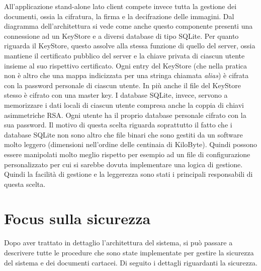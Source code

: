 All'applicazione stand-alone lato client compete invece tutta la gestione dei documenti, ossia la cifratura, la firma e la decifrazione delle immagini. Dal diagramma dell'architettura si vede come anche questo componente presenti una connessione ad un KeyStore e a diversi database di tipo SQLite. Per quanto riguarda il KeyStore, questo assolve alla stessa funzione di quello del server, ossia mantiene il certificato pubblico del server e la chiave privata di ciascun utente insieme al suo rispettivo certificato. Ogni entry del KeyStore (che nella pratica non è altro che una mappa indicizzata per una stringa chiamata \emph{alias}) è cifrata con la password personale di ciascun utente. In più anche il file del KeyStore stesso è cifrato con una master key.
I database SQLite, invece, servono a memorizzare i dati locali di ciascun utente compresa anche la coppia di chiavi asimmetriche RSA. Ogni utente ha il proprio database personale cifrato con la sua password.
Il motivo di questa scelta riguarda soprattutto il fatto che i database SQLite non sono altro che file binari che sono gestiti da un software molto leggero (dimensioni nell'ordine delle centinaia di KiloByte). Quindi possono essere manipolati molto meglio rispetto per esempio ad un file di configurazione personalizzato per cui si sarebbe dovuta implementare una logica di gestione.
Quindi la facilità di gestione e la leggerezza sono stati i principali responsabili di questa scelta.

\section{Focus sulla sicurezza}
	\label{sec:sicurezza}
Dopo aver trattato in dettaglio l'architettura del sistema, si può passare a descrivere tutte le procedure che sono state implementate per gestire la sicurezza del sistema e dei documenti cartacei. Di seguito i dettagli riguardanti la sicurezza.


